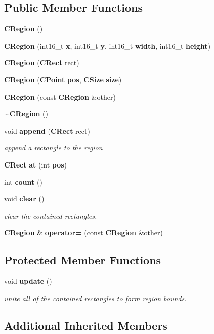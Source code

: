 \subsection*{Public Member Functions}
\begin{DoxyCompactItemize}
\item 
{\bf C\+Region} ()
\item 
{\bf C\+Region} (int16\+\_\+t {\bf x}, int16\+\_\+t {\bf y}, int16\+\_\+t {\bf width}, int16\+\_\+t {\bf height})
\item 
{\bf C\+Region} ({\bf C\+Rect} rect)
\item 
{\bf C\+Region} ({\bf C\+Point} {\bf pos}, {\bf C\+Size} {\bf size})
\item 
{\bf C\+Region} (const {\bf C\+Region} \&other)
\item 
{\bf $\sim$\+C\+Region} ()
\item 
void {\bf append} ({\bf C\+Rect} rect)
\begin{DoxyCompactList}\small\item\em append a rectangle to the region \end{DoxyCompactList}\item 
{\bf C\+Rect} {\bf at} (int {\bf pos})
\item 
int {\bf count} ()
\item 
void {\bf clear} ()
\begin{DoxyCompactList}\small\item\em clear the contained rectangles. \end{DoxyCompactList}\item 
{\bf C\+Region} \& {\bf operator=} (const {\bf C\+Region} \&other)
\end{DoxyCompactItemize}
\subsection*{Protected Member Functions}
\begin{DoxyCompactItemize}
\item 
void {\bf update} ()
\begin{DoxyCompactList}\small\item\em unite all of the contained rectangles to form region bounds. \end{DoxyCompactList}\end{DoxyCompactItemize}
\subsection*{Additional Inherited Members}


